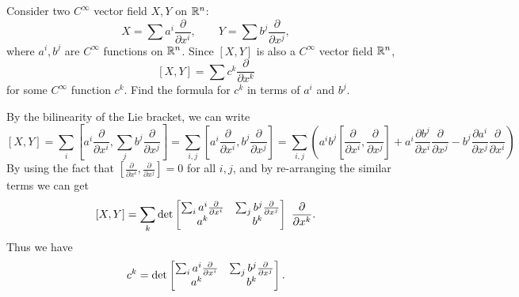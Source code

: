 \begin{problem}
	Consider two $ C^\infty $ vector field $ X, Y $ on $ \mathbb{R}^n $:
	\[ X = \sum a^i \frac{\partial}{\partial x^i},\qquad Y = \sum b^j \frac{\partial}{\partial x^j}, \]
	where $ a^i, b^j$ are $ C^\infty $ functions on $ \mathbb{R}^n $. Since $ [X,Y] $ is also a $ C^\infty $ vector field $ \mathbb{R}^n $,
	\[ [X,Y] = \sum c^k \frac{\partial }{\partial x^k} \]
	for some $ C^\infty $ function $ c^k $. Find the formula for $ c^k $ in terms of $ a^i $ and $ b^j $.
\end{problem}
\begin{solution}
	By the bilinearity of the Lie bracket, we can write
	\[ [X,Y] = \sum_i [a^i \frac{\partial}{\partial x^i}, \sum_j b^j \frac{\partial}{\partial x^j}] 
	= \sum_{i,j}[a^i \frac{\partial }{\partial x^i}, b^j\frac{\partial }{\partial x^j}]
	= \sum_{i,j}( a^i b^j [\frac{\partial }{\partial x^i},\frac{\partial }{\partial x^j}] + a^i \frac{\partial b^j}{\partial x^i}\frac{\partial }{\partial x^j} - b^j \frac{\partial a^i}{\partial x^j}\frac{\partial }{\partial x^i})
	 \]
	By using the fact that $ [\frac{\partial }{\partial x^i},\frac{\partial}{\partial x^j}] = 0 $ for all $ i,j $, and by re-arranging the similar terms we can get
	\[ [X,Y] = \sum_k 
	\det \begin{bmatrix} \sum_i a^i \frac{\partial }{\partial x^i} & \sum_j b^j \frac{\partial}{\partial x^j} \\ a^k & b^k \end{bmatrix}\ \frac{\partial }{\partial x^k}.\]
	Thus we have
	\[ c^k = \det \begin{bmatrix} \sum_i a^i \frac{\partial }{\partial x^i} & \sum_j b^j \frac{\partial}{\partial x^j} \\ a^k & b^k \end{bmatrix}. \]
\end{solution}

